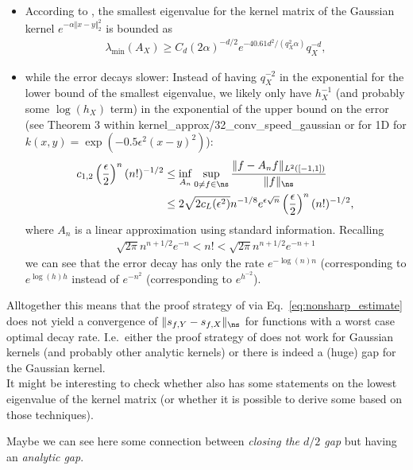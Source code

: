 \documentclass[a4paper, 10pt]{article}
\begin{document}
\begin{itemize}
\item According to \cite[Corollary 12.4]{wendland2005scattered}, the smallest eigenvalue for the kernel matrix of the Gaussian kernel $e^{-\alpha \Vert x - y \Vert_2^2}$ is bounded as
\begin{align*}
\lambda_{\min}(A_X) \geq C_d(2\alpha)^{-d/2} e^{-40.61d^2 / (q_X^2 \alpha)} q_X^{-d},
\end{align*}
\item while the error decays slower: 
Instead of having $q_X^{-2}$ in the exponential for the lower bound of the smallest eigenvalue, 
we likely only have $h_X^{-1}$ (and probably some $\log(h_X)$ term) in the exponential of the upper bound on the error (see Theorem 3 within kernel\_approx/32\_conv\_speed\_gaussian or \cite[Theorem 1.2]{karvonen2022approximation} for 1D for $k(x, y) = \exp(-0.5\epsilon^2 (x-y)^2)$):
\begin{align*}
c_{1,2} \left( \frac{\epsilon}{2} \right)^n (n!)^{-1/2} &\leq \inf_{A_n} \sup_{0 \neq f \in \ns} \frac{ \Vert f - A_n f \Vert_{L^2([-1,1])}}{\Vert f \Vert_{\ns}} \\
&\leq 2 \sqrt{2c_L(\epsilon^2)} n^{-1/8} e^{\epsilon\sqrt{n}} \left( \frac{\epsilon}{2} \right)^n (n!)^{-1/2},
\end{align*}
where $A_n$ is a linear approximation using standard information.
Recalling
\begin{align*}
\sqrt{2\pi} n^{n + 1/2} e^{-n} < n! < \sqrt{2\pi} n^{n + 1/2} e^{-n+1}
\end{align*}
we can see that the error decay has only the rate $e^{-\log(n)n}$ (corresponding to $e^{\log(h)h}$ instead of $e^{-n^2}$ (corresponding to $e^{h^{-2}}$).
\end{itemize}
Alltogether this means that the proof strategy of \cite[Theorem 6.1]{schaback2002inverse} via Eq.\ \eqref{eq:nonsharp_estimate} does not yield a convergence of $\Vert s_{f,Y} - s_{f, X} \Vert_{\ns}$ for functions with a worst case optimal decay rate.
I.e.\ either the proof strategy of \cite[Theorem 6.1]{schaback2002inverse} does not work for Gaussian kernels (and probably other analytic kernels) or there is indeed a (huge) gap for the Gaussian kernel. \\
It might be interesting to check whether \cite{karvonen2022approximation} also has some statements on the lowest eigenvalue of the kernel matrix (or whether it is possible to derive some based on those techniques).

Maybe we can see here some connection between \textit{closing the $d/2$ gap} but having an \textit{analytic gap}.
\end{document}
